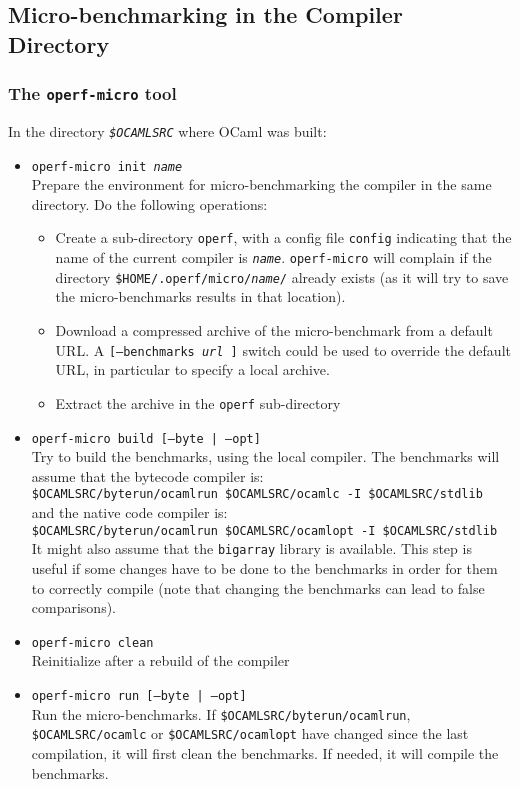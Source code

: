 \documentclass[11pt,a4paper]{article}
\begin{document}
\subsection{Micro-benchmarking in the Compiler Directory}

\subsubsection{The {\tt operf-micro} tool}

In the directory {\tt\em \$OCAMLSRC} where OCaml was built:
\begin{itemize}
\item {\tt operf-micro init {\em name}}\\ Prepare the environment
  for micro-benchmarking the compiler in the same directory.
  Do the following operations:
  \begin{itemize}
  \item Create a sub-directory {\tt operf}, with a config file {\tt config}
  indicating that the name of the current compiler is {\tt\em name}.
  {\tt operf-micro} will complain if the directory
  {\tt \$HOME/.operf/micro/{\em name}/} already exists (as it will try to
  save the micro-benchmarks results in that location).
  \item Download a compressed archive of the micro-benchmark from a
    default URL. A {\tt [--benchmarks {\em url} ]} switch could be
    used to override the default URL, in particular to specify a local
    archive.
  \item Extract the archive in the {\tt operf} sub-directory
  \end{itemize}
\item {\tt operf-micro build [--byte | --opt]}\\
  Try to build the benchmarks, using the local compiler. The benchmarks will
  assume that the bytecode compiler is:\\
  {\tt \$OCAMLSRC/byterun/ocamlrun \$OCAMLSRC/ocamlc -I \$OCAMLSRC/stdlib}\\
  and the native code compiler is:\\
  {\tt \$OCAMLSRC/byterun/ocamlrun \$OCAMLSRC/ocamlopt -I \$OCAMLSRC/stdlib}\\
  It might also assume that the {\tt bigarray} library is available.
  This step is useful if some changes have to be done to the benchmarks in
  order for them to correctly compile (note that changing the benchmarks
  can lead to false comparisons).
\item {\tt operf-micro clean}\\
  Reinitialize after a rebuild of the compiler
\item {\tt operf-micro run [--byte | --opt]}\\
  Run the micro-benchmarks. If {\tt \$OCAMLSRC/byterun/ocamlrun},
  {\tt \$OCAMLSRC/ocamlc} or {\tt \$OCAMLSRC/ocamlopt} have changed since the
  last compilation, it will first clean the benchmarks. If needed, it will
  compile the benchmarks.


\end{itemize}
\end{document}
